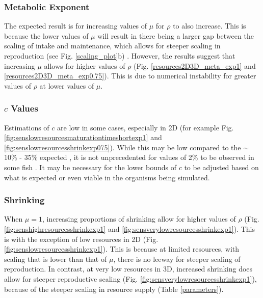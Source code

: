 \documentclass[a4paper, 11pt, hidelinks]{article} %
\begin{document}
	\subsubsection{Metabolic Exponent}
	The expected result is for increasing values of $\mu$ for $\rho$ to also increase.  This is because the lower values of $\mu$ will result in there being a larger gap between the scaling of intake and maintenance, which allows for steeper scaling in reproduction (see Fig. \ref{scaling_plot}b) \parencite{Marshall2019}.  
	However, the results suggest that increasing $\mu$ allows for higher values of $\rho$ (Fig. \ref{resources2D3D_meta_exp1} and \ref{resources2D3D_meta_exp0.75}).  This is due to numerical instability for greater values of $ \rho $ at lower values of $ \mu $.
		
	\subsubsection{$c$ Values}
	Estimations of $c$ are low in some cases, especially in 2D (for example Fig. \ref{fig:senslowresourcesmaturationtimeshortexp1} and \ref{fig:senslowresourcesshrinkexp075}).  While this may be low compared to the $\sim$10\% - 35\% expected \parencite{Roff1983, Wootton1985, Fontoura2009, Benoit2018}, it is not unprecedented for values of 2\% to be observed in some fish \parencite{Gunderson1997}.  
	It may be necessary for the lower bounds of $c$ to be adjusted based on what is expected or even viable in the organisms being simulated.
		
	\subsubsection{Shrinking}
	When $ \mu = 1$, increasing proportions of shrinking allow for higher values of $ \rho $ (Fig. \ref{fig:senshighresourcesshrinkexp1} and \ref{fig:sensverylowresourcesshrinkexp1}).  This is with the exception of low resources in 2D (Fig. \ref{fig:senslowresourcesshrinkexp1}).  This is because at limited resources, with scaling that is lower than that of $ \mu $, there is no leeway for steeper scaling of reproduction.  In contrast, at very low resources in 3D, increased shrinking does allow for steeper reproductive scaling (Fig. \ref{fig:sensverylowresourcesshrinkexp1}), because of the steeper scaling in resource supply (Table \ref{parameters}).
	
\end{document}
